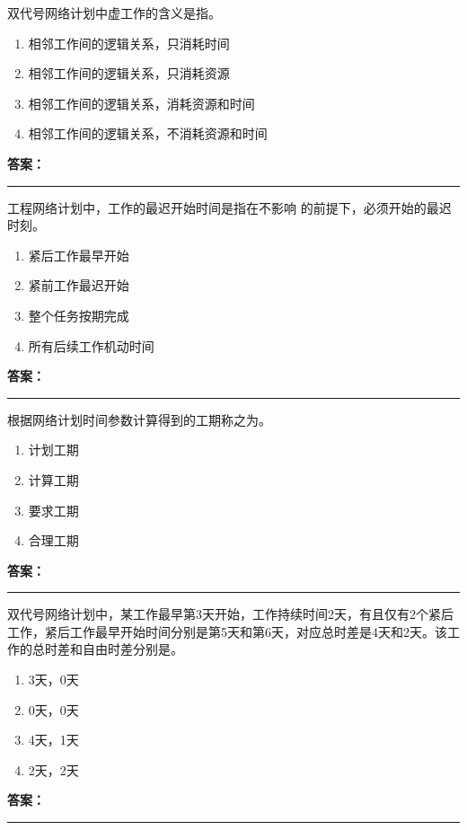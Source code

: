 \documentclass[UTF8,fontset=fandol,11pt]{ctexart}
\newcommand{\answerline}{\textcolor{answerred}{\rule{2.4cm}{0.7pt}}}
\begin{document}
\begin{quizbox}[title={第 1 题}]
双代号网络计划中虚工作的含义是指。\\
\begin{enumerate}[label=\Alph*.]
\item 相邻工作间的逻辑关系，只消耗时间
\item 相邻工作间的逻辑关系，只消耗资源
\item 相邻工作间的逻辑关系，消耗资源和时间
\item 相邻工作间的逻辑关系，不消耗资源和时间
\end{enumerate}
\textbf{\textcolor{answerred}{答案：}} \answerline
\end{quizbox}

\vspace{0.2em}

\begin{quizbox}[title={第 2 题}]
工程网络计划中，工作的最迟开始时间是指在不影响 的前提下，必须开始的最迟时刻。\\
\begin{enumerate}[label=\Alph*.]
\item 紧后工作最早开始
\item 紧前工作最迟开始
\item 整个任务按期完成
\item 所有后续工作机动时间
\end{enumerate}
\textbf{\textcolor{answerred}{答案：}} \answerline
\end{quizbox}

\vspace{0.2em}

\begin{quizbox}[title={第 3 题}]
根据网络计划时间参数计算得到的工期称之为。\\
\begin{enumerate}[label=\Alph*.]
\item 计划工期
\item 计算工期
\item 要求工期
\item 合理工期
\end{enumerate}
\textbf{\textcolor{answerred}{答案：}} \answerline
\end{quizbox}

\vspace{0.2em}

\begin{quizbox}[title={第 4 题}]
双代号网络计划中，某工作最早第3天开始，工作持续时间2天，有且仅有2个紧后工作，紧后工作最早开始时间分别是第5天和第6天，对应总时差是4天和2天。该工作的总时差和自由时差分别是。\\
\begin{enumerate}[label=\Alph*.]
\item 3天，0天
\item 0天，0天
\item 4天，1天
\item 2天，2天
\end{enumerate}
\textbf{\textcolor{answerred}{答案：}} \answerline
\end{quizbox}
\end{document}
